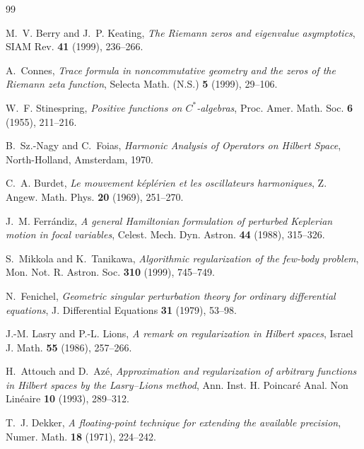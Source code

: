 \documentclass[11pt,a4paper,reqno]{article}
\theoremstyle{plain}
\theoremstyle{definition}
\theoremstyle{remark}
\numberwithin{equation}{section}
\begin{document}
\clearpage
\begin{thebibliography}{99}

M.~V. Berry and J.~P. Keating,
\textit{The Riemann zeros and eigenvalue asymptotics},
SIAM Rev. \textbf{41} (1999), 236--266.

A.~Connes,
\textit{Trace formula in noncommutative geometry and the zeros of the Riemann zeta function},
Selecta Math. (N.S.) \textbf{5} (1999), 29--106.

W.~F. Stinespring,
\textit{Positive functions on $C^*$-algebras},
Proc. Amer. Math. Soc. \textbf{6} (1955), 211--216.

B.~Sz.-Nagy and C.~Foias,
\textit{Harmonic Analysis of Operators on Hilbert Space},
North-Holland, Amsterdam, 1970.

C.~A. Burdet,
\textit{Le mouvement k\'{e}pl\'{e}rien et les oscillateurs harmoniques},
Z. Angew. Math. Phys. \textbf{20} (1969), 251--270.

J.~M. Ferr\'{a}ndiz,
\textit{A general Hamiltonian formulation of perturbed Keplerian motion in focal variables},
Celest. Mech. Dyn. Astron. \textbf{44} (1988), 315--326.

S.~Mikkola and K.~Tanikawa,
\textit{Algorithmic regularization of the few-body problem},
Mon. Not. R. Astron. Soc. \textbf{310} (1999), 745--749.

N.~Fenichel,
\textit{Geometric singular perturbation theory for ordinary differential equations},
J. Differential Equations \textbf{31} (1979), 53--98.

J.-M. Lasry and P.-L. Lions,
\textit{A remark on regularization in Hilbert spaces},
Israel J. Math. \textbf{55} (1986), 257--266.

H.~Attouch and D.~Az\'{e},
\textit{Approximation and regularization of arbitrary functions in Hilbert spaces by the Lasry--Lions method},
Ann. Inst. H. Poincar\'{e} Anal. Non Lin\'{e}aire \textbf{10} (1993), 289--312.

T.~J. Dekker,
\textit{A floating-point technique for extending the available precision},
Numer. Math. \textbf{18} (1971), 224--242.


\end{thebibliography}
\end{document}
